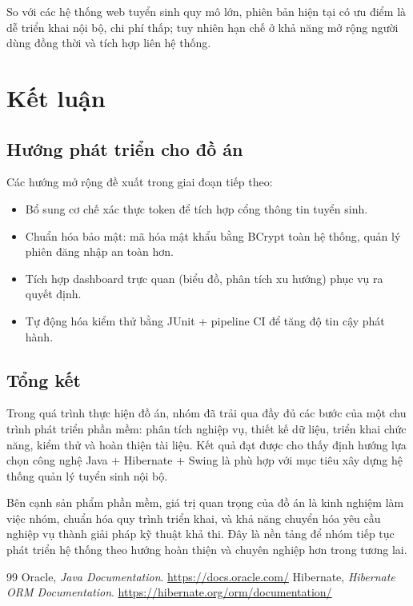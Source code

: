 \documentclass[12pt,a4paper,oneside]{report}
\begin{document}
So với các hệ thống web tuyển sinh quy mô lớn, phiên bản hiện tại có ưu điểm là dễ triển khai nội bộ, chi phí thấp; tuy nhiên hạn chế ở khả năng mở rộng người dùng đồng thời và tích hợp liên hệ thống.

\chapter{Kết luận}
\section{Hướng phát triển cho đồ án}
Các hướng mở rộng đề xuất trong giai đoạn tiếp theo:
\begin{itemize}
  \item Bổ sung cơ chế xác thực token để tích hợp cổng thông tin tuyển sinh.
  \item Chuẩn hóa bảo mật: mã hóa mật khẩu bằng BCrypt toàn hệ thống, quản lý phiên đăng nhập an toàn hơn.
  \item Tích hợp dashboard trực quan (biểu đồ, phân tích xu hướng) phục vụ ra quyết định.
  \item Tự động hóa kiểm thử bằng JUnit + pipeline CI để tăng độ tin cậy phát hành.
\end{itemize}

\section{Tổng kết}
Trong quá trình thực hiện đồ án, nhóm đã trải qua đầy đủ các bước của một chu trình phát triển phần mềm: phân tích nghiệp vụ, thiết kế dữ liệu, triển khai chức năng, kiểm thử và hoàn thiện tài liệu. Kết quả đạt được cho thấy định hướng lựa chọn công nghệ Java + Hibernate + Swing là phù hợp với mục tiêu xây dựng hệ thống quản lý tuyển sinh nội bộ.

Bên cạnh sản phẩm phần mềm, giá trị quan trọng của đồ án là kinh nghiệm làm việc nhóm, chuẩn hóa quy trình triển khai, và khả năng chuyển hóa yêu cầu nghiệp vụ thành giải pháp kỹ thuật khả thi. Đây là nền tảng để nhóm tiếp tục phát triển hệ thống theo hướng hoàn thiện và chuyên nghiệp hơn trong tương lai.

\begin{thebibliography}{99}
 Oracle, \textit{Java Documentation}. \url{https://docs.oracle.com/}
 Hibernate, \textit{Hibernate ORM Documentation}. \url{https://hibernate.org/orm/documentation/}
\end{thebibliography}
\end{document}
